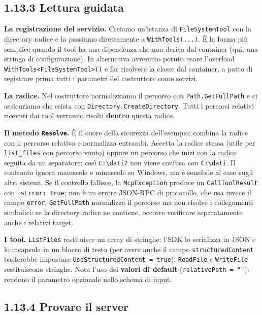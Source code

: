 \documentclass[
  italian,
  10pt,
]{book}
\begin{document}
\subsection{1.13.3 Lettura guidata}\label{lettura-guidata}

\textbf{La registrazione del servizio.} Creiamo un'istanza di
\texttt{FileSystemTool} con la directory radice e la passiamo
direttamente a \texttt{WithTools(...)}. È la forma più semplice quando
il tool ha una dipendenza che non deriva dal container (qui, una stringa
di configurazione). In alternativa avremmo potuto usare l'overload
\texttt{WithTools\textless{}FileSystemTool\textgreater{}()} e far
risolvere la classe dal container, a patto di registrare prima tutti i
parametri del costruttore come servizi.

\textbf{La radice.} Nel costruttore normalizziamo il percorso con
\texttt{Path.GetFullPath} e ci assicuriamo che esista con
\texttt{Directory.CreateDirectory}. Tutti i percorsi relativi ricevuti
dai tool verranno risolti \textbf{dentro} questa radice.

\textbf{Il metodo \texttt{Resolve}.} È il cuore della sicurezza
dell'esempio: combina la radice con il percorso relativo e normalizza
entrambi. Accetta la radice stessa (utile per \texttt{list\_files} con
percorso vuoto) oppure un percorso che inizi con la radice seguita da un
separatore: così \texttt{C:\textbackslash{}dati2} non viene confusa con
\texttt{C:\textbackslash{}dati}. Il confronto ignora maiuscole e
minuscole su Windows, ma è sensibile al caso sugli altri sistemi. Se il
controllo fallisce, la \texttt{McpException} produce un
\texttt{CallToolResult} con \texttt{isError:\ true}; non è un errore
JSON-RPC di protocollo, che usa invece il campo \texttt{error}.
\texttt{GetFullPath} normalizza il percorso ma non risolve i
collegamenti simbolici: se la directory radice ne contiene, occorre
verificare separatamente anche i relativi target.

\textbf{I tool.} \texttt{ListFiles} restituisce un array di stringhe:
l'SDK lo serializza in JSON e lo incapsula in un blocco di testo (per
avere anche il campo \texttt{structuredContent} basterebbe impostare
\texttt{UseStructuredContent\ =\ true}). \texttt{ReadFile} e
\texttt{WriteFile} restituiscono stringhe. Nota l'uso dei \textbf{valori
di default} (\texttt{relativePath\ =\ ""}): rendono il parametro
opzionale nello schema di input.

\subsection{1.13.4 Provare il server}\label{provare-il-server}
\end{document}
